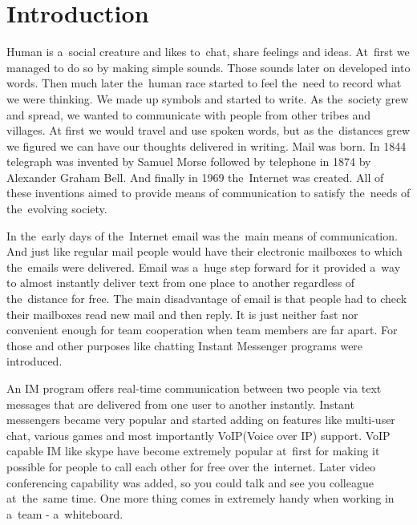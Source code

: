 
\chapter*{Introduction}
Human is a~social creature and likes to~chat, share feelings and ideas. At~first we managed to do so by making simple sounds. Those sounds later on developed into words. Then much later the~human race started to feel the~need to record what we were thinking. We made up symbols and started to write. As the~society grew and spread, we wanted to communicate with people from other tribes and villages. At first we would travel and use spoken words, but as the~distances grew we figured we can have our thoughts delivered in writing. Mail was born. In 1844 telegraph was invented by Samuel Morse followed by telephone in 1874 by Alexander Graham Bell. And finally in 1969 the~Internet was created. All of these inventions aimed to provide means of communication to satisfy the~needs of the~evolving society.  

In the~early days of the~Internet email was the~main means of communication. And just like regular mail people would have their electronic mailboxes to which the~emails were delivered. Email was a~huge step forward for it provided a~way to almost instantly deliver text from one place to another regardless of the~distance for free. The main disadvantage of email is that people had to check their mailboxes read new mail and then reply. It is just neither fast nor convenient enough for team cooperation when team members are far apart. For those and other purposes like chatting Instant Messenger programs were introduced.    

An IM program offers real-time communication between two people via text messages that are delivered from one user to another instantly. Instant messengers became very popular and started adding on features like multi-user chat, various games and most importantly VoIP(Voice over IP) support. VoIP capable IM like skype have become extremely popular at~first for making it possible for people to call each other for free over the~internet. Later video conferencing capability was added, so you could talk and see you colleague at~the~same time. One more thing comes in extremely handy when working in a~team - a~whiteboard.

